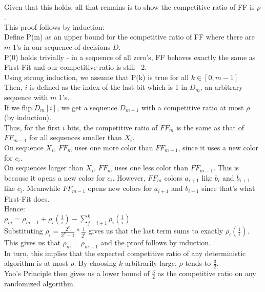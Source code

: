 \documentclass{article}
\begin{document}
\\Given that this holds, all that remains is to show the competitive ratio of FF is $\rho$. 
\\This proof follows by induction:
\\Define P(m) as an upper bound for the competitive ratio of FF where there are $m$ 1's in our sequence of decisions $D$.
\\P(0) holds trivially - in a sequence of all zero's, FF behaves exactly the same as First-Fit and our competitive ratio is still ~2.
\\Using strong induction, we assume that P(k) is true for all $k \in [0,m-1]$
\\Then, $i$ is defined as the index of the last bit which is 1 in $D_m$, an arbitrary sequence with $m$ 1's.
\\If we flip $D_m[i]$, we get a sequence $D_{m-1}$ with a competitive ratio at most $\rho$ (by induction).
\\Thus, for the first $i$ bits, the competitive ratio of $FF_m$ is the same as that of $FF_{m-1}$ for all sequences smaller than $X_i$. 
\\On sequence $X_i$, $FF_m$ uses one more color than $FF_{m-1}$, since it uses a new color for $c_i$.
\\On sequences larger than $X_i$, $FF_m$ uses one less color than $FF_{m-1}$. This is because it opens a new color for $c_i$. However, $FF_m$ colors $a_{i+1}$ like $b_i$ and $b_{i+1}$ like $c_i$. Meanwhile $FF_{m-1}$ opens new colors for $a_{i+1}$ and $b_{i+1}$ since that's what First-Fit does. 
\\Hence:
\\$\rho_m = \rho_{m-1} + \rho_i(\frac{1}{i}) - \sum_{j=i+1}^k \rho_i(\frac{1}{i})$
\\Substituting $\rho_i = \frac{2^k}{2^k-1}*\frac{i}{2^i}$ gives us that the last term sums to exactly $\rho_i(\frac{1}{i})$.
\\This gives us that $\rho_m = \rho_{m-1}$ and the proof follows by induction.
\\In turn, this implies that the expected competitive ratio of any deterministic algorithm is at most $\rho$. By choosing $k$ arbitrarily large, $\rho$ tends to $\frac{3}{2}$. 
\\Yao's Principle then gives us a lower bound of $\frac{3}{2}$ as the competitive ratio on any randomized algorithm.
\end{document}
